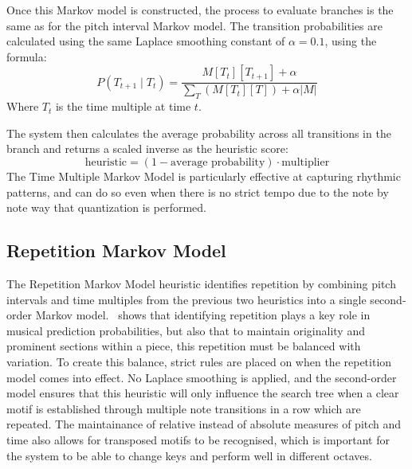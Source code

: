 Once this Markov model is constructed, the process to evaluate branches is the same as for the pitch interval Markov model. The transition probabilities are calculated using the same Laplace smoothing constant of $\alpha = 0.1$, using the formula:
\begin{equation}
    P( T_{t+1} \mid T_t ) = \frac{M[T_t][T_{t+1}] + \alpha}{\sum_{T}(M[T_t][T]) + \alpha\left|M\right|}
\end{equation}
Where $T_{t}$ is the time multiple at time $t$.

The system then calculates the average probability across all transitions in the branch and returns a scaled inverse as the heuristic score:
\begin{equation}
    \text{heuristic} = (1 - \text{average probability}) \cdot \text{multiplier}
\end{equation}
The Time Multiple Markov Model is particularly effective at capturing rhythmic patterns, and can do so even when there is no strict tempo due to the note by note way that quantization is performed.

\subsection{Repetition Markov Model}

The Repetition Markov Model heuristic identifies repetition by combining pitch intervals and time multiples from the previous two heuristics into a single second-order Markov model.~\cite{Duane2016Repetition} shows that identifying repetition plays a key role in musical prediction probabilities, but also that to maintain originality and prominent sections within a piece, this repetition must be balanced with variation. To create this balance, strict rules are placed on when the repetition model comes into effect. No Laplace smoothing is applied, and the second-order model ensures that this heuristic will only influence the search tree when a clear motif is established through multiple note transitions in a row which are repeated. The maintainance of relative instead of absolute measures of pitch and time also allows for transposed motifs to be recognised, which is important for the system to be able to change keys and perform well in different octaves.

